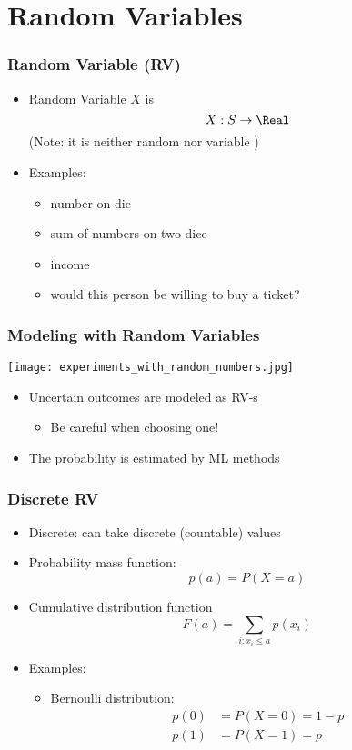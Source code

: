 \documentclass[mathserif, xcolor=table, svgnames]{beamer}
\begin{document}
\section{Random Variables}

\begin{frame}
  \frametitle{Random Variable (RV)}
  \begin{itemize}
  \item Random Variable $X$ is
    \begin{equation*}
      X: S \rightarrow \Real
    \end{equation*}
    (Note: it is neither random nor variable \smiley)
  \item Examples:
    \begin{itemize}
    \item number on die
    \item sum of numbers on two dice 
    \item income
    \item would this person be willing to buy a ticket?
    \end{itemize}
  \end{itemize}
\end{frame}

\begin{frame}
  \frametitle{Modeling with Random Variables}
  \texttt{[image: experiments\_with\_random\_numbers.jpg]}
  \begin{itemize}
    \item Uncertain outcomes are modeled as RV-s
      \begin{itemize}
      \item Be careful when choosing one!
      \end{itemize}
    \item The probability is estimated by ML methods
  \end{itemize}
\end{frame}

\begin{frame}
  \frametitle{Discrete RV}
  \begin{itemize}
  \item Discrete: can take discrete (countable) values
  \item Probability mass function:
    \begin{equation*}
      p(a) = P(X = a)
    \end{equation*}
  \item Cumulative distribution function
    \begin{equation*}
      F(a) = \sum_{i: x_{i} \le a} p(x_{i})
    \end{equation*}
  \item Examples:
    \begin{itemize}
    \item Bernoulli distribution:
      \begin{align*}
        p(0) &= P(X = 0) = 1 - p\\
        p(1) &= P(X = 1) = p
      \end{align*}
    \end{itemize}
  \end{itemize}
\end{frame}
\end{document}
